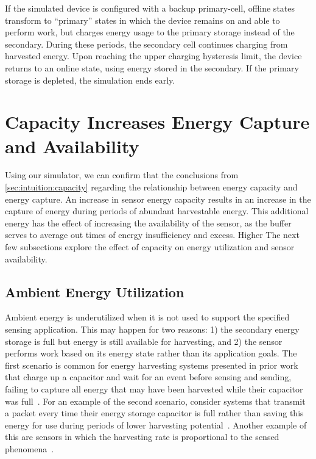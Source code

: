 If the simulated device is configured with a backup primary-cell, offline
states transform to ``primary'' states in which the device remains on and
able to perform work, but charges energy usage to the primary storage instead
of the secondary. During these periods, the secondary cell continues charging
from harvested energy. Upon reaching the upper charging hysteresis
limit, the device returns to an online state, using energy stored in the
secondary.  If the primary storage is depleted, the simulation ends early.


\section{Capacity Increases Energy Capture and Availability}
\label{sec:capacity:capture}

Using our simulator, we can confirm that the conclusions 
from \cref{sec:intuition:capacity}
regarding the relationship between energy capacity and energy capture. 
An increase in sensor energy capacity results in an increase in the capture of energy during periods of abundant harvestable energy.
This additional energy has the effect of increasing the availability of the sensor, as the buffer serves to average out times of energy insufficiency and excess.
Higher
The next few subsections explore the effect of capacity on energy utilization and sensor availability.

\subsection{Ambient Energy Utilization}
\label{sec:capacity:utilization}

Ambient energy is underutilized when it is not used to support the specified
sensing application. This may happen for two reasons: 1) 
the secondary
energy storage is full but energy is still available for harvesting, and 2) the
sensor performs work based on its energy state rather than its application
goals. The first scenario is common for energy harvesting systems
presented in prior work that charge up a capacitor and wait for an event
before sensing and sending, failing to capture all energy that may
have been harvested while their capacitor was full~\cite{campbellEnergy14, afanasov2020battery}.
For an example of the second scenario, consider
systems that transmit a packet every time their energy storage capacitor
is full rather than saving this energy for use during periods of lower harvesting
potential~\cite{hesterFlicker17, colinReconfigurable18}. Another example of this are sensors in which the harvesting
rate is proportional to the sensed phenomena~\cite{debruin2013monjolo}.

